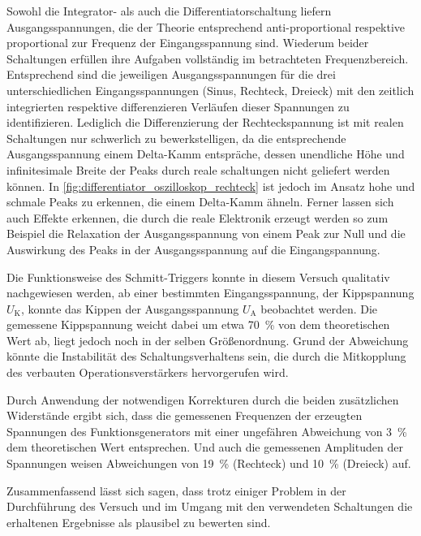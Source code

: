 Sowohl die Integrator- als auch die Differentiatorschaltung  liefern Ausgangsspannungen, die der Theorie
entsprechend anti-proportional respektive proportional zur Frequenz der Eingangsspannung sind. Wiederum 
beider Schaltungen erfüllen ihre Aufgaben vollständig im betrachteten Frequenzbereich.
Entsprechend sind die jeweiligen Ausgangsspannungen für die drei unterschiedlichen Eingangsspannungen
(Sinus, Rechteck, Dreieck) mit den zeitlich integrierten respektive differenzieren Verläufen 
dieser Spannungen zu identifizieren. Lediglich die Differenzierung der Rechteckspannung ist mit realen 
Schaltungen nur schwerlich zu bewerkstelligen, da die entsprechende Ausgangsspannung einem Delta-Kamm
entspräche, dessen unendliche Höhe und infinitesimale Breite der Peaks durch reale schaltungen 
nicht geliefert werden können. In \cref{fig:differentiator_oszilloskop_rechteck} ist jedoch im Ansatz 
hohe und schmale Peaks zu erkennen, die einem Delta-Kamm ähneln. Ferner lassen sich auch Effekte erkennen,
die durch die reale Elektronik erzeugt werden so zum Beispiel die Relaxation der Ausgangsspannung von einem 
Peak zur Null und die Auswirkung des Peaks in der Ausgangsspannung auf die Eingangspannung.

Die Funktionsweise des Schmitt-Triggers konnte in diesem Versuch qualitativ nachgewiesen werden,
ab einer bestimmten Eingangsspannung, der Kippspannung $U_{\mathrm{K}}$, konnte das Kippen der 
Ausgangsspannung $U_{\mathrm{A}}$ beobachtet werden. Die gemessene Kippspannung weicht dabei um 
etwa \SI{70}{\percent} von dem theoretischen Wert ab, liegt jedoch noch in der selben Größenordnung.
Grund der Abweichung könnte die Instabilität des Schaltungsverhaltens sein, die durch die Mitkopplung des
verbauten Operationsverstärkers hervorgerufen wird.

Durch Anwendung der notwendigen Korrekturen durch die beiden zusätzlichen Widerstände ergibt sich,
dass die gemessenen Frequenzen der erzeugten Spannungen des Funktionsgenerators mit einer ungefähren 
Abweichung von \SI{3}{\percent} dem theoretischen Wert entsprechen. Und auch die gemessenen Amplituden 
der Spannungen weisen Abweichungen von \SI{19}{\percent} (Rechteck) und \SI{10}{\percent} (Dreieck)
auf.

Zusammenfassend lässt sich sagen, dass trotz einiger Problem in der Durchführung des Versuch 
und im Umgang mit den verwendeten Schaltungen die erhaltenen Ergebnisse als plausibel zu bewerten sind.  



  


 